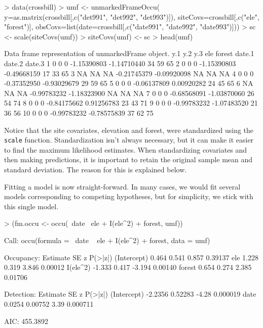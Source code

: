 \documentclass[a4paper]{article}
\renewenvironment{Schunk}{\vspace{\topsep}}{\vspace{\topsep}}
\begin{document}
\begin{Schunk}
\begin{Sinput}
> data(crossbill)
> umf <- unmarkedFrameOccu(
     y=as.matrix(crossbill[,c("det991", "det992", "det993")]),
     siteCovs=crossbill[,c("ele", "forest")],
     obsCovs=list(date=crossbill[,c("date991", "date992", "date993")]))
> sc <- scale(siteCovs(umf))
> siteCovs(umf) <- sc
> head(umf)
\end{Sinput}
\begin{Soutput}
Data frame representation of unmarkedFrame object.
   y.1 y.2 y.3         ele      forest date.1 date.2 date.3
1    0   0   0 -1.15390803 -1.14710440     34     59     65
2    0   0   0 -1.15390803 -0.49668159     17     33     65
3   NA  NA  NA -0.21745379 -0.09920098     NA     NA     NA
4    0   0   0 -0.37352950 -0.93029679     29     59     65
5    0   0   0 -0.06137809  0.00920282     24     45     65
6   NA  NA  NA -0.99783232 -1.18323900     NA     NA     NA
7    0   0   0 -0.68568091 -1.03870060     26     54     74
8    0   0   0 -0.84175662  0.91256783     23     43     71
9    0   0   0 -0.99783232 -1.07483520     21     36     56
10   0   0   0 -0.99783232 -0.78575839     37     62     75
\end{Soutput}
\end{Schunk}

Notice that the site covariates, elevation and forest, were
standardized using the \verb+scale+ function. Standardization isn't
always necessary, but it can make it easier to find the maximum
likelihood estimates. When standardizing covariates and then making
predictions, it is important to retain the original sample mean and
standard deviation. The reason for this is explained below.

\newpage

Fitting a model is now straight-forward. In many cases, we would fit
several models corresponding to competing hypotheses, but for
simplicity, we stick with this single model.

\begin{Schunk}
\begin{Sinput}
> (fm.occu <- occu(~date ~ele + I(ele^2) + forest, umf))
\end{Sinput}
\begin{Soutput}
Call:
occu(formula = ~date ~ ele + I(ele^2) + forest, data = umf)

Occupancy:
            Estimate    SE      z P(>|z|)
(Intercept)    0.464 0.541  0.857 0.39137
ele            1.228 0.319  3.846 0.00012
I(ele^2)      -1.333 0.417 -3.194 0.00140
forest         0.654 0.274  2.385 0.01706

Detection:
            Estimate      SE     z  P(>|z|)
(Intercept)  -2.2356 0.52283 -4.28 0.000019
date          0.0254 0.00752  3.39 0.000711

AIC: 455.3892 
\end{Soutput}
\end{Schunk}
\end{document}
